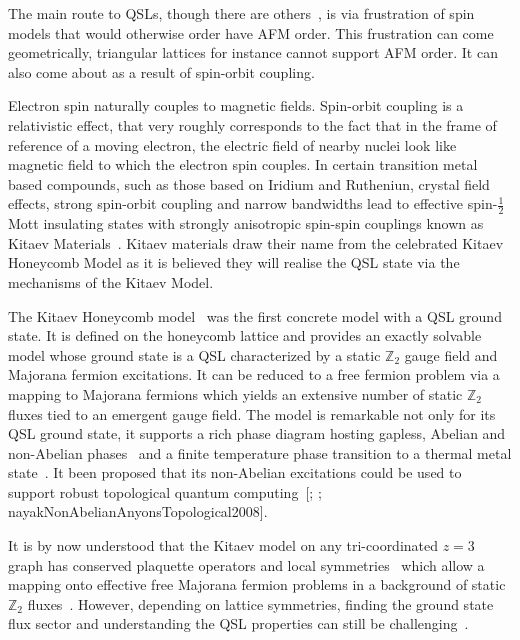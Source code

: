 The main route to QSLs, though there are others~\autocite{balentsNodalLiquidTheory1998,balentsDualOrderParameter1999,linExactSymmetryWeaklyinteracting1998}, is via frustration of spin models that would otherwise order have AFM order. This frustration can come geometrically, triangular lattices for instance cannot support AFM order. It can also come about as a result of spin-orbit coupling.

Electron spin naturally couples to magnetic fields. Spin-orbit coupling is a relativistic effect, that very roughly corresponds to the fact that in the frame of reference of a moving electron, the electric field of nearby nuclei look like magnetic field to which the electron spin couples. In certain transition metal based compounds, such as those based on Iridium and Rutheniun, crystal field effects, strong spin-orbit coupling and narrow bandwidths lead to effective spin-\(\tfrac{1}{2}\) Mott insulating states with strongly anisotropic spin-spin couplings known as Kitaev Materials~\autocite{Jackeli2009,HerrmannsAnRev2018,Winter2017,TrebstPhysRep2022,Takagi2019}. Kitaev materials draw their name from the celebrated Kitaev Honeycomb Model as it is believed they will realise the QSL state via the mechanisms of the Kitaev Model.

The Kitaev Honeycomb model~\autocite{kitaevAnyonsExactlySolved2006} was the first concrete model with a QSL ground state. It is defined on the honeycomb lattice and provides an exactly solvable model whose ground state is a QSL characterized by a static \(\mathbb Z_2\) gauge field and Majorana fermion excitations. It can be reduced to a free fermion problem via a mapping to Majorana fermions which yields an extensive number of static \(\mathbb Z_2\) fluxes tied to an emergent gauge field. The model is remarkable not only for its QSL ground state, it supports a rich phase diagram hosting gapless, Abelian and non-Abelian phases~\autocite{knolleDynamicsFractionalizationQuantum2015} and a finite temperature phase transition to a thermal metal state~\autocite{selfThermallyInducedMetallic2019}. It been proposed that its non-Abelian excitations could be used to support robust topological quantum computing~{[}\textcite{kitaev_fault-tolerant_2003}; \textcite{freedmanTopologicalQuantumComputation2003}; nayakNonAbelianAnyonsTopological2008{]}.

It is by now understood that the Kitaev model on any tri-coordinated \(z=3\) graph has conserved plaquette operators and local symmetries~\autocite{Baskaran2007,Baskaran2008} which allow a mapping onto effective free Majorana fermion problems in a background of static \(\mathbb Z_2\) fluxes~\autocite{Nussinov2009,OBrienPRB2016,yaoExactChiralSpin2007,hermanns2015weyl}. However, depending on lattice symmetries, finding the ground state flux sector and understanding the QSL properties can still be challenging~\autocite{eschmann2019thermodynamics,Peri2020}.


